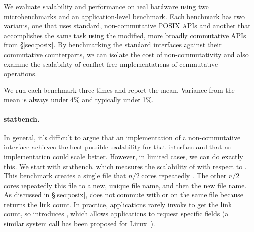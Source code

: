 

We evaluate scalability and performance on real hardware using two
microbenchmarks and an application-level benchmark.  Each benchmark has
two variants, one that uses standard, non-commutative POSIX APIs and
another that accomplishes the same task using the modified, more broadly
commutative APIs from \S\ref{sec:posix}.
%
By benchmarking the standard interfaces against
their commutative counterparts, we can isolate the cost of
non-commutativity and also examine the scalability of
conflict-free implementations of commutative operations.

We run each benchmark three times and report the mean.  Variance from
the mean is always under 4\% and typically under 1\%.  


\paragraph{statbench.} In general, it's difficult to argue that an implementation of a
non-commutative interface achieves the best possible scalability for
that interface and that no implementation could scale better.  However,
in limited cases, we can do exactly this.  We start with statbench,
which measures the scalability of  with respect to
.  This benchmark creates a single file that $n/2$ cores
repeatedly . The other $n/2$ cores repeatedly
 this file to a new, unique file name, and then 
the new file name.  As discussed in \S\ref{sec:posix},  does not
commute with  or  on the same file because
 returns the link count.  In practice,
applications rarely invoke  to get the link count, so \sys
introduces , which allows applications to request specific
fields (a similar system call has been proposed for
Linux~\cite{linux:xstat}).

